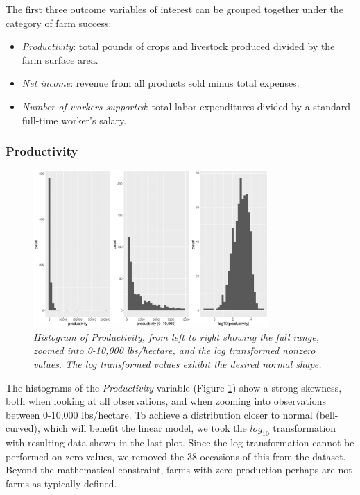\documentclass{article}
\begin{document}
The first three outcome variables of interest can be grouped together under the category of farm success:
\begin{itemize}
	\item \textit{Productivity}: total pounds of crops and livestock produced divided by the farm surface area. 	
	\item \textit{Net income}: revenue from all products sold minus total expenses.
	\item \textit{Number of workers supported}: total labor expenditures divided by a standard 
	full-time worker's salary.
\end{itemize}

\subsubsection{Productivity}

\begin{figure}[h]
\centering
\includegraphics[width = 0.8\textwidth]{production_histograms.pdf}
\setlength{\belowcaptionskip}{-10pt}
\caption{\textsl{\small Histogram of Productivity, from left to right showing the full range, zoomed into 0-10,000 lbs/hectare, and the log transformed nonzero values. The log transformed values exhibit the desired normal shape.}}
\label{figure:prod_hist}
\end{figure}

The histograms of the \textit{Productivity} variable (Figure \ref{figure:prod_hist}) show a strong skewness, both when looking at 
all observations, and when zooming into observations between 0-10,000 lbs/hectare. To achieve a distribution closer to normal 
(bell-curved), which will benefit the linear model, we took the $log_{10}$ transformation with resulting data shown in the last 
plot. Since the log transformation cannot be performed on zero values, we removed the 38 occasions of this from the dataset. 
Beyond the mathematical constraint, farms with zero production perhaps are not farms as typically defined.
\end{document}
